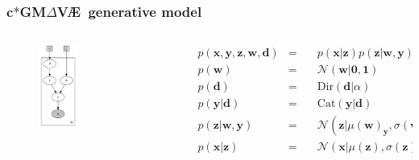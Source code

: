 \documentclass[final]{beamer}
\newcommand{\x}{\mathbf{x}}
\newcommand{\z}{\mathbf{z}}
\newcommand{\y}{\mathbf{y}}
\newcommand{\w}{\mathbf{w}}
\newcommand{\dd}{\mathbf{d}}
\newcommand{\NN}{\mathcal{N}}
\newcommand{\bv}[1]{\boldsymbol{#1}}
\newcommand{\gmvae}{c$\ast$GM$\Delta$V\AE~}
\begin{document}
\begin{frame}
\frametitle{\gmvae generative model}

\begin{columns}[T]
\begin{column}{0.5\linewidth}
\begin{figure}[h]
\centering
\includegraphics[width=0.4\textwidth]{plots/dirichlet_gmm_p.gv.png}
\end{figure}
\end{column}

\begin{column}{0.5\linewidth}
{\tiny
\begin{equation}
\label{eq:gmmfact}
\begin{aligned}
&p(\x, \y, \z, \w, \dd) &=\quad& 
p(\x | \z) p(\z | \w, \y) p(\y | \dd) p(\dd) p(\w) \\
&p(\w) &=\quad& \NN(\w | \bv{0},\bv{1}) \\
&p(\dd) &=\quad& \text{Dir}(\dd | \alpha) \\
&p(\y | \dd) &=\quad& \text{Cat}(\y | \dd) \\
&p(\z | \w, \y) &=\quad& \NN(\z | \mu(\w)_{\y}, \sigma(\w)_{\y})) \\
&p(\x | \z) &=\quad& \NN(\x | \mu(\z), \sigma(\z))
\end{aligned}
\end{equation}
}
\end{column}
\end{columns}
\end{frame}
\end{document}
